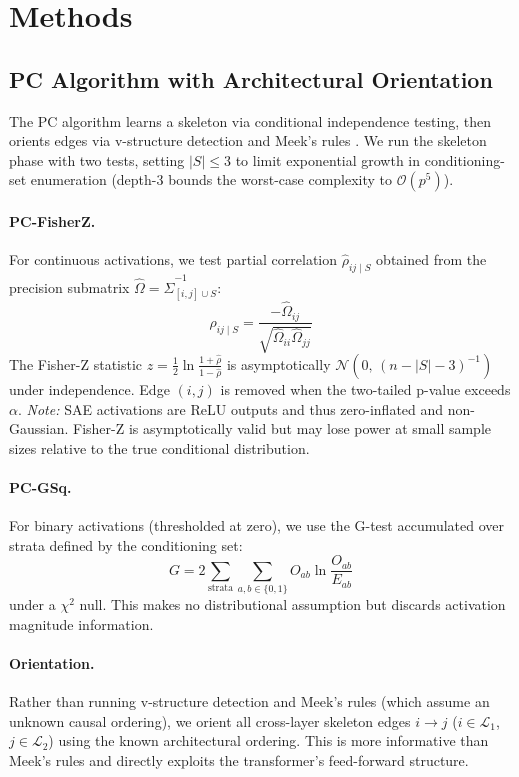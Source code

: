 \documentclass{article}
\begin{document}
\section{Methods}

\subsection{PC Algorithm with Architectural Orientation}

The PC algorithm \citep{spirtes2000causation} learns a skeleton via conditional
independence testing, then orients edges via v-structure detection and Meek's
rules \citep{meek1995causal}. We run the skeleton phase with two tests, setting
$|S| \leq 3$ to limit exponential growth in conditioning-set enumeration
(depth-3 bounds the worst-case complexity to $\mathcal{O}(p^5)$).

\paragraph{PC-FisherZ.}
For continuous activations, we test partial correlation $\hat{\rho}_{ij \mid S}$
obtained from the precision submatrix $\hat{\Omega} = \hat{\Sigma}^{-1}_{[i,j]\cup S}$:
\[
  \hat{\rho}_{ij \mid S} = \frac{-\hat{\Omega}_{ij}}{\sqrt{\hat{\Omega}_{ii}\hat{\Omega}_{jj}}}
\]
The Fisher-Z statistic $z = \frac{1}{2}\ln\frac{1+\hat{\rho}}{1-\hat{\rho}}$ is
asymptotically $\mathcal{N}(0,\, (n{-}|S|{-}3)^{-1})$ under independence.
Edge $(i,j)$ is removed when the two-tailed p-value exceeds $\alpha$.
\emph{Note:} SAE activations are ReLU outputs and thus zero-inflated and
non-Gaussian. Fisher-Z is asymptotically valid but may lose power at small
sample sizes relative to the true conditional distribution.

\paragraph{PC-GSq.}
For binary activations (thresholded at zero), we use the G-test accumulated
over strata defined by the conditioning set:
\[
  G = 2 \sum_{\text{strata}} \sum_{a,b \in \{0,1\}} O_{ab} \ln\!\frac{O_{ab}}{E_{ab}}
\]
under a $\chi^2$ null. This makes no distributional assumption but discards
activation magnitude information.

\paragraph{Orientation.}
Rather than running v-structure detection and Meek's rules (which assume an
unknown causal ordering), we orient all cross-layer skeleton edges $i \to j$
($i \in \mathcal{L}_1$, $j \in \mathcal{L}_2$) using the known architectural
ordering. This is more informative than Meek's rules and directly exploits
the transformer's feed-forward structure.
\end{document}
